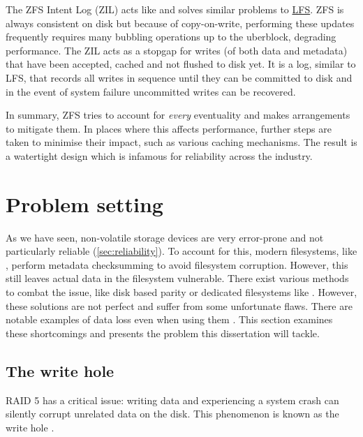             The ZFS Intent Log (ZIL) acts like and solves similar problems to
            \hyperref[sec:LFS]{LFS}. ZFS is always consistent on disk but because
            of copy-on-write, performing these updates frequently requires many
            bubbling operations up to the uberblock, degrading performance. The
            ZIL acts as a stopgap for writes (of both data and metadata) that
            have been accepted, cached and not flushed to disk yet. It is a
            log, similar to LFS, that records all writes in sequence until they
            can be committed to disk and in the event of system failure uncommitted
            writes can be recovered.

            In summary, ZFS tries to account for \textit{every} eventuality and
            makes arrangements to mitigate them. In places where this affects
            performance, further steps are taken to minimise their impact, such
            as various caching mechanisms. The result is a watertight design
            which is infamous for reliability across the industry.

\chapter{Problem setting}
    \label{ch:setting}

    As we have seen, non-volatile storage devices are very error-prone and not
    particularly reliable (\autoref{sec:reliability}). To account for this, modern
    filesystems, like , perform metadata checksumming to
    avoid filesystem corruption. However, this still leaves actual data in the
    filesystem vulnerable. There exist various methods to combat the issue,
    like disk based parity  or dedicated filesystems like
    . However, these solutions are not perfect and suffer
    from some unfortunate flaws. There are notable examples of data loss even
    when using them \cite{LTT_data_loss}. This section examines these
    shortcomings and presents the problem this dissertation will tackle.

    \section{The write hole}
        \label{sec:RAID_problems}

        RAID 5 has a critical issue: writing data and experiencing a system
        crash can silently corrupt unrelated data on the disk. This phenomenon
        is known as the write hole \cite{LWN_md_journal}.

